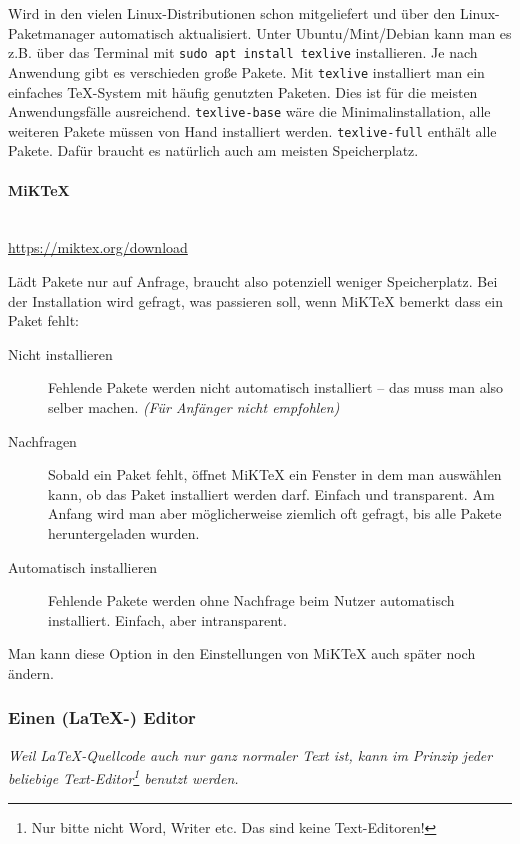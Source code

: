 			\noindent Wird in den vielen Linux-Distributionen schon mitgeliefert und über den Linux-Paketmanager automatisch aktualisiert.
			Unter Ubuntu/Mint/Debian kann man es z.B. über das Terminal mit  
			\lstinline|sudo apt install texlive| installieren.
			Je nach Anwendung gibt es verschieden große Pakete. Mit \lstinline|texlive| installiert man ein einfaches TeX-System mit häufig genutzten Paketen. Dies ist für die meisten Anwendungsfälle ausreichend.
			\lstinline|texlive-base| wäre die Minimalinstallation, alle weiteren Pakete müssen von Hand installiert werden.
			\lstinline|texlive-full| enthält alle Pakete. Dafür braucht es natürlich auch am meisten Speicherplatz.
			
			\paragraph{MiKTeX}~\\
			  
			\hfill
			\url{https://miktex.org/download}
			
			\noindent Lädt Pakete nur auf Anfrage, braucht also potenziell weniger Speicherplatz.
			Bei der Installation wird gefragt, was passieren soll, wenn MiKTeX bemerkt dass ein Paket fehlt:
			\begin{description}
				\item[Nicht installieren] Fehlende Pakete werden nicht automatisch installiert -- das muss man also selber machen. \textit{(Für Anfänger nicht empfohlen)}
				\item[Nachfragen] Sobald ein Paket fehlt, öffnet MiKTeX ein Fenster in dem man auswählen kann, ob das Paket installiert werden darf. Einfach und transparent. Am Anfang wird man aber möglicherweise ziemlich oft gefragt, bis alle Pakete heruntergeladen wurden.
				\item[Automatisch installieren] Fehlende Pakete werden ohne Nachfrage beim Nutzer automatisch installiert. Einfach, aber intransparent.
			\end{description}
			
			Man kann diese Option in den Einstellungen von MiKTeX auch später noch ändern.
			
			\subsubsection{Einen (LaTeX-) Editor}
			\emph{Weil \LaTeX-Quellcode auch nur ganz normaler Text ist, kann im Prinzip jeder beliebige Text-Editor\footnote{Nur bitte nicht Word, Writer etc. Das sind keine Text-Editoren!} benutzt werden.}
			\medskip
			
